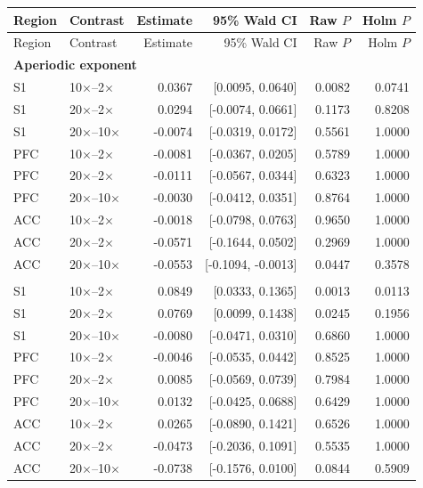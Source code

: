 \begin{longtable}{llrrrr}
\toprule
Region & Contrast & Estimate & 95\% Wald CI & Raw $P$ & Holm $P$ \\
\midrule
\endfirsthead
\toprule
Region & Contrast & Estimate & 95\% Wald CI & Raw $P$ & Holm $P$ \\
\midrule
\endhead
\multicolumn{6}{l}{\textbf{Aperiodic exponent}} \\
S1 & 10$\times$--2$\times$ & 0.0367 & [0.0095, 0.0640] & 0.0082 & 0.0741 \\
S1 & 20$\times$--2$\times$ & 0.0294 & [-0.0074, 0.0661] & 0.1173 & 0.8208 \\
S1 & 20$\times$--10$\times$ & -0.0074 & [-0.0319, 0.0172] & 0.5561 & 1.0000 \\
PFC & 10$\times$--2$\times$ & -0.0081 & [-0.0367, 0.0205] & 0.5789 & 1.0000 \\
PFC & 20$\times$--2$\times$ & -0.0111 & [-0.0567, 0.0344] & 0.6323 & 1.0000 \\
PFC & 20$\times$--10$\times$ & -0.0030 & [-0.0412, 0.0351] & 0.8764 & 1.0000 \\
ACC & 10$\times$--2$\times$ & -0.0018 & [-0.0798, 0.0763] & 0.9650 & 1.0000 \\
ACC & 20$\times$--2$\times$ & -0.0571 & [-0.1644, 0.0502] & 0.2969 & 1.0000 \\
ACC & 20$\times$--10$\times$ & -0.0553 & [-0.1094, -0.0013] & 0.0447 & 0.3578 \\
\addlinespace
\multicolumn{6}{l}{\textbf{Aperiodic offset}} \\
S1 & 10$\times$--2$\times$ & 0.0849 & [0.0333, 0.1365] & 0.0013 & 0.0113 \\
S1 & 20$\times$--2$\times$ & 0.0769 & [0.0099, 0.1438] & 0.0245 & 0.1956 \\
S1 & 20$\times$--10$\times$ & -0.0080 & [-0.0471, 0.0310] & 0.6860 & 1.0000 \\
PFC & 10$\times$--2$\times$ & -0.0046 & [-0.0535, 0.0442] & 0.8525 & 1.0000 \\
PFC & 20$\times$--2$\times$ & 0.0085 & [-0.0569, 0.0739] & 0.7984 & 1.0000 \\
PFC & 20$\times$--10$\times$ & 0.0132 & [-0.0425, 0.0688] & 0.6429 & 1.0000 \\
ACC & 10$\times$--2$\times$ & 0.0265 & [-0.0890, 0.1421] & 0.6526 & 1.0000 \\
ACC & 20$\times$--2$\times$ & -0.0473 & [-0.2036, 0.1091] & 0.5535 & 1.0000 \\
ACC & 20$\times$--10$\times$ & -0.0738 & [-0.1576, 0.0100] & 0.0844 & 0.5909 \\

\end{longtable}
